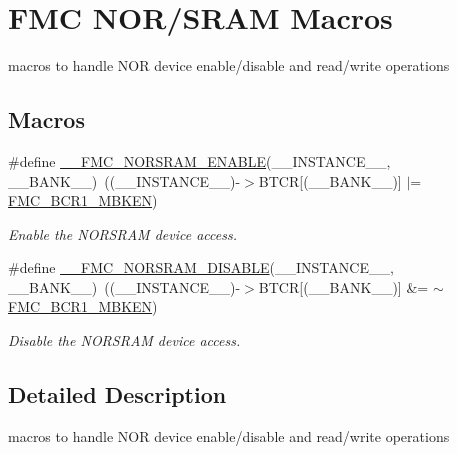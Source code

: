\hypertarget{group___f_m_c___l_l___n_o_r___macros}{}\section{F\+MC N\+O\+R/\+S\+R\+AM Macros}
\label{group___f_m_c___l_l___n_o_r___macros}


macros to handle N\+OR device enable/disable and read/write operations  


\subsection*{Macros}
\begin{DoxyCompactItemize}
\item 
\#define \hyperlink{group___f_m_c___l_l___n_o_r___macros_ga3439ff665bae18ccd6442c12ec0f608b}{\+\_\+\+\_\+\+F\+M\+C\+\_\+\+N\+O\+R\+S\+R\+A\+M\+\_\+\+E\+N\+A\+B\+LE}(\+\_\+\+\_\+\+I\+N\+S\+T\+A\+N\+C\+E\+\_\+\+\_\+,  \+\_\+\+\_\+\+B\+A\+N\+K\+\_\+\+\_\+)~((\+\_\+\+\_\+\+I\+N\+S\+T\+A\+N\+C\+E\+\_\+\+\_\+)-\/$>$B\+T\+CR\mbox{[}(\+\_\+\+\_\+\+B\+A\+N\+K\+\_\+\+\_\+)\mbox{]} $\vert$= \hyperlink{group___peripheral___registers___bits___definition_ga8071c51a621c27198498af06ea0adf15}{F\+M\+C\+\_\+\+B\+C\+R1\+\_\+\+M\+B\+K\+EN})
\begin{DoxyCompactList}\small\item\em Enable the N\+O\+R\+S\+R\+AM device access. \end{DoxyCompactList}\item 
\#define \hyperlink{group___f_m_c___l_l___n_o_r___macros_gafca44410b72dec386bf717bd0a5b878f}{\+\_\+\+\_\+\+F\+M\+C\+\_\+\+N\+O\+R\+S\+R\+A\+M\+\_\+\+D\+I\+S\+A\+B\+LE}(\+\_\+\+\_\+\+I\+N\+S\+T\+A\+N\+C\+E\+\_\+\+\_\+,  \+\_\+\+\_\+\+B\+A\+N\+K\+\_\+\+\_\+)~((\+\_\+\+\_\+\+I\+N\+S\+T\+A\+N\+C\+E\+\_\+\+\_\+)-\/$>$B\+T\+CR\mbox{[}(\+\_\+\+\_\+\+B\+A\+N\+K\+\_\+\+\_\+)\mbox{]} \&= $\sim$\hyperlink{group___peripheral___registers___bits___definition_ga8071c51a621c27198498af06ea0adf15}{F\+M\+C\+\_\+\+B\+C\+R1\+\_\+\+M\+B\+K\+EN})
\begin{DoxyCompactList}\small\item\em Disable the N\+O\+R\+S\+R\+AM device access. \end{DoxyCompactList}\end{DoxyCompactItemize}


\subsection{Detailed Description}
macros to handle N\+OR device enable/disable and read/write operations 



